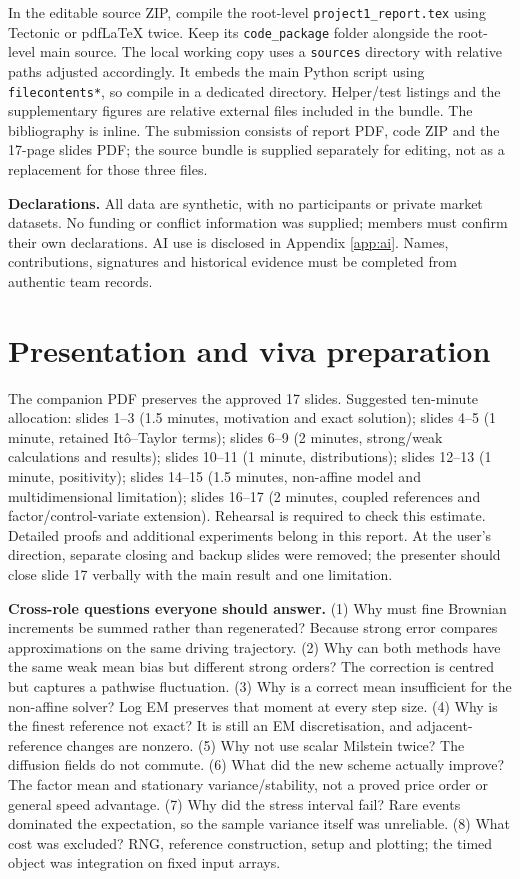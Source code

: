 In the editable source ZIP, compile the root-level \texttt{project1\_report.tex} using Tectonic or pdfLaTeX twice. Keep its \texttt{code\_package} folder alongside the root-level main source. The local working copy uses a \texttt{sources} directory with relative paths adjusted accordingly. It embeds the main Python script using \texttt{filecontents*}, so compile in a dedicated directory. Helper/test listings and the supplementary figures are relative external files included in the bundle. The bibliography is inline. The submission consists of report PDF, code ZIP and the 17-page slides PDF; the source bundle is supplied separately for editing, not as a replacement for those three files.

\textbf{Declarations.} All data are synthetic, with no participants or private market datasets. No funding or conflict information was supplied; members must confirm their own declarations. AI use is disclosed in Appendix \ref{app:ai}. Names, contributions, signatures and historical evidence must be completed from authentic team records.

\clearpage
\section{Presentation and viva preparation}
\label{app:viva}
The companion PDF preserves the approved 17 slides. Suggested ten-minute allocation: slides 1--3 (1.5 minutes, motivation and exact solution); slides 4--5 (1 minute, retained It\^o--Taylor terms); slides 6--9 (2 minutes, strong/weak calculations and results); slides 10--11 (1 minute, distributions); slides 12--13 (1 minute, positivity); slides 14--15 (1.5 minutes, non-affine model and multidimensional limitation); slides 16--17 (2 minutes, coupled references and factor/control-variate extension). Rehearsal is required to check this estimate. Detailed proofs and additional experiments belong in this report. At the user's direction, separate closing and backup slides were removed; the presenter should close slide 17 verbally with the main result and one limitation.

\textbf{Cross-role questions everyone should answer.}
(1) Why must fine Brownian increments be summed rather than regenerated? Because strong error compares approximations on the same driving trajectory.
(2) Why can both methods have the same weak mean bias but different strong orders? The correction is centred but captures a pathwise fluctuation.
(3) Why is a correct mean insufficient for the non-affine solver? Log EM preserves that moment at every step size.
(4) Why is the finest reference not exact? It is still an EM discretisation, and adjacent-reference changes are nonzero.
(5) Why not use scalar Milstein twice? The diffusion fields do not commute.
(6) What did the new scheme actually improve? The factor mean and stationary variance/stability, not a proved price order or general speed advantage.
(7) Why did the stress interval fail? Rare events dominated the expectation, so the sample variance itself was unreliable.
(8) What cost was excluded? RNG, reference construction, setup and plotting; the timed object was integration on fixed input arrays.

